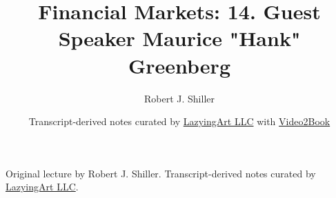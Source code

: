 \documentclass[11pt,oneside]{book}
\begin{document}
\frontmatter
\title{Financial Markets: 14. Guest Speaker Maurice "Hank" Greenberg}
\author{Robert J. Shiller}
\date{Transcript-derived notes curated by \href{https://lazying.art}{LazyingArt LLC} with \href{https://github.com/lachlanchen/Video2Book}{Video2Book}}
\maketitle
\begin{center}
\small Original lecture by Robert J. Shiller. Transcript-derived notes curated by \href{https://lazying.art}{LazyingArt LLC}.
\end{center}
\clearpage
\mainmatter

\end{document}
